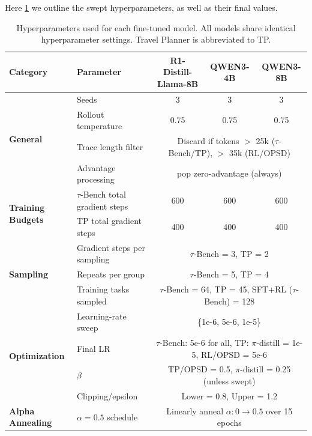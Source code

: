 Here \cref{tab:hyperparams_models} we outline the swept hyperparameters, as well as their final values. 
\label{app:hps}
\begin{table}[h]
\centering
\footnotesize
\setlength{\tabcolsep}{4pt}
\begin{tabular}{@{}lp{4.5cm}ccc@{}}
\toprule
\textbf{Category} & \textbf{Parameter} & \textbf{R1-Distill-Llama-8B} & \textbf{QWEN3-4B} & \textbf{QWEN3-8B} \\
\midrule
\multirow{4}{*}{\textbf{General}} 
& Seeds & 3 & 3 & 3 \\
& Rollout temperature & 0.75 & 0.75 & 0.75 \\
& Trace length filter & \multicolumn{3}{c}{Discard if tokens $>$ 25k ($\tau$-Bench/TP), $>$ 35k (RL/OPSD)} \\
& Advantage processing & \multicolumn{3}{c}{pop zero-advantage (always)} \\
\midrule
\multirow{2}{*}{\textbf{Training Budgets}} 
& $\tau$-Bench total gradient steps & 600 & 600 & 600 \\
& TP total gradient steps & 400 & 400 & 400 \\
\midrule
\multirow{3}{*}{\textbf{Sampling}} 
& Gradient steps per sampling & \multicolumn{3}{c}{$\tau$-Bench = 3, TP = 2} \\
& Repeats per group & \multicolumn{3}{c}{$\tau$-Bench = 5, TP = 4} \\
& Training tasks sampled & \multicolumn{3}{c}{$\tau$-Bench = 64, TP = 45, SFT+RL ($\tau$-Bench) = 128} \\
\midrule
\multirow{4}{*}{\textbf{Optimization}} 
& Learning-rate sweep & \multicolumn{3}{c}{\{1e{-}6, 5e{-}6, 1e{-}5\}} \\
& Final LR & \multicolumn{3}{c}{$\tau$-Bench: 5e{-}6 for all, TP: $\pi$-distill = 1e{-}5, RL/OPSD = 5e{-}6} \\
& $\beta$ & \multicolumn{3}{c}{TP/OPSD = 0.5, $\pi$-distill = 0.25 (unless swept)} \\
& Clipping/epsilon & \multicolumn{3}{c}{Lower = 0.8, Upper = 1.2} \\
\midrule
\textbf{Alpha Annealing} 
& $\alpha=0.5$ schedule & \multicolumn{3}{c}{Linearly anneal $\alpha: 0 \rightarrow 0.5$ over 15 epochs} \\
\bottomrule
\end{tabular}
\caption{Hyperparameters used for each fine-tuned model. All models share identical hyperparameter settings. Travel Planner is abbreviated to TP.}
\label{tab:hyperparams_models}
\end{table}






